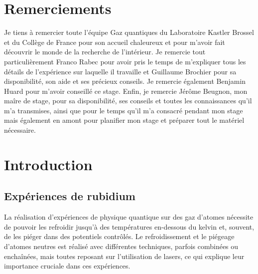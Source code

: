 \documentclass[11pt,a4paper] { article}
\begin{document}
\newpage

\thispagestyle{empty}
\section*{Remerciements}

Je tiens à remercier toute l'équipe Gaz quantiques du Laboratoire Kastler Brossel et du Collège de France pour son accueil chaleureux et pour m'avoir fait découvrir le monde de la recherche de l'intérieur. Je remercie tout particulièrement Franco Rabec pour avoir pris le temps de m'expliquer tous les détails de l'expérience sur laquelle il travaille et Guillaume Brochier pour sa disponibilité, son aide et ses précieux conseils. Je remercie également Benjamin Huard pour m'avoir conseillé ce stage. Enfin, je remercie Jérôme Beugnon, mon maîre de stage, pour sa disponibilité, ses conseils et toutes les connaissances qu'il m'a transmises, ainsi que pour le temps qu'il m'a consacré pendant mon stage mais également en amont pour planifier mon stage et préparer tout le matériel nécessaire. 
\tableofcontents
\newpage


\setcounter{page}{1}


\setlength{\parindent}{16pt}

\section{Introduction}


\subsection{Expériences de rubidium}

La réalisation d'expériences de physique quantique sur des gaz d'atomes nécessite de pouvoir les refroidir jusqu'à des températures en-dessous du kelvin et, souvent, de les piéger dans des potentiels contrôlés. Le refroidissement et le piégeage d'atomes neutres est réalisé avec différentes techniques, parfois combinées ou enchaînées, mais toutes reposant sur l'utilisation de lasers, ce qui explique leur importance cruciale dans ces expériences.
\end{document}
